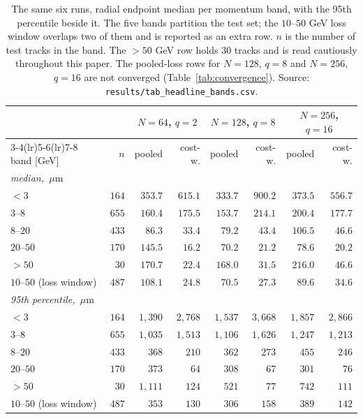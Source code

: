 \documentclass[11pt,a4paper]{article}
\newcommand{\um}{\ensuremath{\,\mu\mathrm{m}}}
\begin{document}
\begin{table}[tbp]
  \centering
  \caption{The same six runs, radial endpoint median per momentum band, with
  the 95th percentile beside it. The five bands partition the test set; the
  $10$--$50$ GeV loss window overlaps two of them and is reported as an extra
  row. $n$ is the number of test tracks in the band. The $>50$ GeV row holds
  $30$ tracks and is read cautiously throughout this paper. The pooled-loss
  rows for $N = 128$, $q = 8$ and $N = 256$, $q = 16$ are not converged
  (Table~\ref{tab:convergence}). Source:
  \texttt{results/tab\_headline\_bands.csv}.}
  \label{tab:headlinebands}
  \footnotesize
  \setlength{\tabcolsep}{4pt}
  \begin{tabular}{lrrrrrrr}
    \toprule
    & & \multicolumn{2}{c}{$N = 64$, $q = 2$} &
        \multicolumn{2}{c}{$N = 128$, $q = 8$} &
        \multicolumn{2}{c}{$N = 256$, $q = 16$} \\
    \cmidrule(lr){3-4}\cmidrule(lr){5-6}\cmidrule(lr){7-8}
    band [GeV] & $n$ & pooled & cost-w. & pooled & cost-w. & pooled & cost-w. \\
    \midrule
    \multicolumn{8}{l}{\emph{median, \um}}\\
    $<3$                    & $164$ & $353.7$ & $615.1$ & $333.7$ & $900.2$ & $373.5$ & $556.7$ \\
    $3$--$8$                & $655$ & $160.4$ & $175.5$ & $153.7$ & $214.1$ & $200.4$ & $177.7$ \\
    $8$--$20$               & $433$ & $86.3$  & $33.4$  & $79.2$  & $43.4$  & $106.5$ & $46.6$  \\
    $20$--$50$              & $170$ & $145.5$ & $16.2$  & $70.2$  & $21.2$  & $78.6$  & $20.2$  \\
    $>50$                   & $30$  & $170.7$ & $22.4$  & $168.0$ & $31.5$  & $216.0$ & $46.6$  \\
    $10$--$50$ (loss window) & $487$ & $108.1$ & $\mathbf{24.8}$ & $70.5$ & $\mathbf{27.3}$ & $89.6$ & $\mathbf{34.6}$ \\
    \midrule
    \multicolumn{8}{l}{\emph{95th percentile, \um}}\\
    $<3$                    & $164$ & $1{,}390$ & $2{,}768$ & $1{,}537$ & $3{,}668$ & $1{,}857$ & $2{,}866$ \\
    $3$--$8$                & $655$ & $1{,}035$ & $1{,}513$ & $1{,}106$ & $1{,}626$ & $1{,}247$ & $1{,}213$ \\
    $8$--$20$               & $433$ & $368$     & $210$     & $362$     & $273$     & $455$     & $246$ \\
    $20$--$50$              & $170$ & $373$     & $64$      & $308$     & $67$      & $301$     & $76$ \\
    $>50$                   & $30$  & $1{,}111$ & $124$     & $521$     & $77$      & $742$     & $111$ \\
    $10$--$50$ (loss window) & $487$ & $353$    & $130$     & $306$     & $158$     & $389$     & $142$ \\
    \bottomrule
  \end{tabular}
\end{table}
\end{document}

